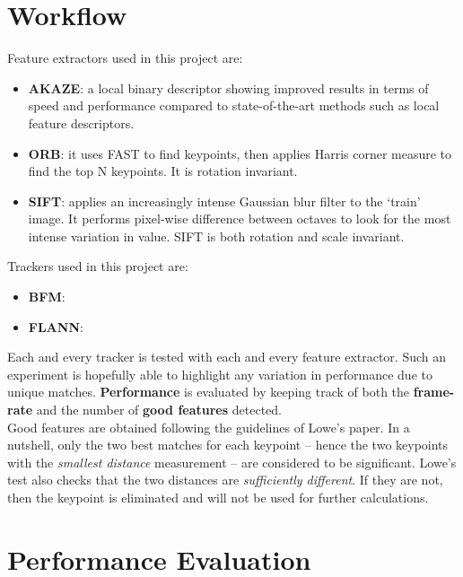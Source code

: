\documentclass[conference]{IEEEtran}
\begin{document}

\section{Workflow}

Feature extractors used in this project are:
\begin{itemize}
    \item \textbf{AKAZE}: a local binary descriptor showing improved results in terms of speed and performance compared to state-of-the-art methods such as local feature descriptors.
    \item \textbf{ORB}: it uses FAST to find keypoints, then applies Harris corner measure to find the top N keypoints. It is rotation invariant.
    \item \textbf{SIFT}: applies an increasingly intense Gaussian blur filter to the `train' image. It performs pixel-wise difference between octaves to look for the most intense variation in value. SIFT is both rotation and scale invariant.
\end{itemize}

Trackers used in this project are:
\begin{itemize}
    \item \textbf{BFM}:
    \item \textbf{FLANN}:
\end{itemize}


Each and every tracker is tested with each and every feature extractor. Such an experiment is hopefully able to highlight any variation in performance due to unique matches. \textbf{Performance} is evaluated by keeping track of both the \textbf{frame-rate} and the number of \textbf{good features} detected.\\
Good features are obtained following the guidelines of Lowe's paper.
In a nutshell, only the two best matches for each keypoint -- hence the two keypoints with the \textit{smallest distance}
measurement -- are considered to be significant.
Lowe's test also checks that the two distances are \textit{sufficiently different}. If they are not, then the keypoint is eliminated
and will not be used for further calculations.



\section{Performance Evaluation}
\end{document}
